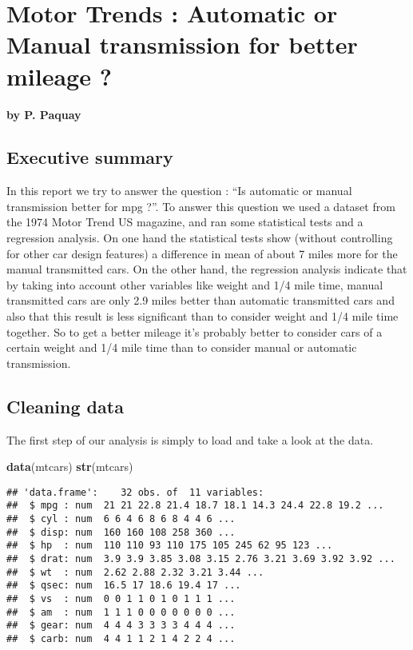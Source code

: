 \documentclass[a3paper]{article}
\author{}
\date{}
\newenvironment{Shaded}{\begin{snugshade}}{\end{snugshade}}
\newcommand{\KeywordTok}[1]{\textcolor[rgb]{0.13,0.29,0.53}{\textbf{{#1}}}}
\newcommand{\NormalTok}[1]{{#1}}
\begin{document}
\begin{center}
\normalsize
\end{center}


\section{Motor Trends : Automatic or Manual transmission for better
mileage
?}\label{motor-trends-automatic-or-manual-transmission-for-better-mileage}

\textbf{by P. Paquay}

\subsection{Executive summary}\label{executive-summary}

In this report we try to answer the question : ``Is automatic or manual
transmission better for mpg ?''. To answer this question we used a
dataset from the 1974 Motor Trend US magazine, and ran some statistical
tests and a regression analysis. On one hand the statistical tests show
(without controlling for other car design features) a difference in mean
of about 7 miles more for the manual transmitted cars. On the other
hand, the regression analysis indicate that by taking into account other
variables like weight and 1/4 mile time, manual transmitted cars are
only 2.9 miles better than automatic transmitted cars and also that this
result is less significant than to consider weight and 1/4 mile time
together. So to get a better mileage it's probably better to consider
cars of a certain weight and 1/4 mile time than to consider manual or
automatic transmission.

\subsection{Cleaning data}\label{cleaning-data}

The first step of our analysis is simply to load and take a look at the
data.

\begin{Shaded}
\begin{Highlighting}[]
\KeywordTok{data}\NormalTok{(mtcars)}
\KeywordTok{str}\NormalTok{(mtcars)}
\end{Highlighting}
\end{Shaded}

\begin{verbatim}
## 'data.frame':    32 obs. of  11 variables:
##  $ mpg : num  21 21 22.8 21.4 18.7 18.1 14.3 24.4 22.8 19.2 ...
##  $ cyl : num  6 6 4 6 8 6 8 4 4 6 ...
##  $ disp: num  160 160 108 258 360 ...
##  $ hp  : num  110 110 93 110 175 105 245 62 95 123 ...
##  $ drat: num  3.9 3.9 3.85 3.08 3.15 2.76 3.21 3.69 3.92 3.92 ...
##  $ wt  : num  2.62 2.88 2.32 3.21 3.44 ...
##  $ qsec: num  16.5 17 18.6 19.4 17 ...
##  $ vs  : num  0 0 1 1 0 1 0 1 1 1 ...
##  $ am  : num  1 1 1 0 0 0 0 0 0 0 ...
##  $ gear: num  4 4 4 3 3 3 3 4 4 4 ...
##  $ carb: num  4 4 1 1 2 1 4 2 2 4 ...
\end{verbatim}
\end{document}
